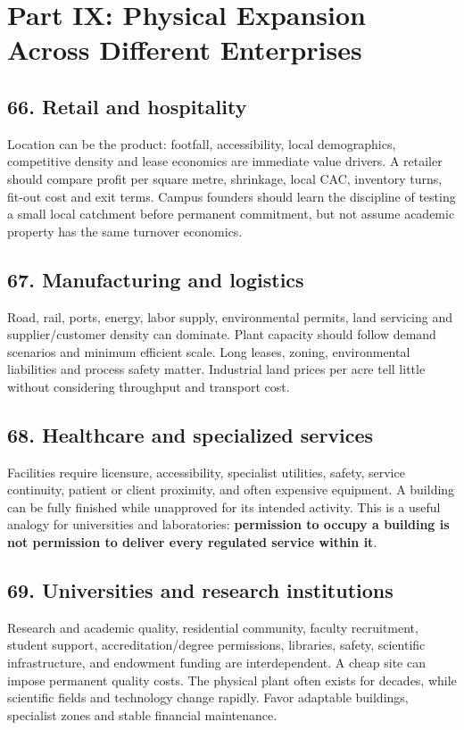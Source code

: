 \section*{Part IX: Physical Expansion Across Different Enterprises}


\subsection{66. Retail and hospitality}

Location can be the product: footfall, accessibility, local demographics, competitive density and lease economics are immediate value drivers. A retailer should compare profit per square metre, shrinkage, local CAC, inventory turns, fit-out cost and exit terms. Campus founders should learn the discipline of testing a small local catchment before permanent commitment, but not assume academic property has the same turnover economics.


\subsection{67. Manufacturing and logistics}

Road, rail, ports, energy, labor supply, environmental permits, land servicing and supplier/customer density can dominate. Plant capacity should follow demand scenarios and minimum efficient scale. Long leases, zoning, environmental liabilities and process safety matter. Industrial land prices per acre tell little without considering throughput and transport cost.


\subsection{68. Healthcare and specialized services}

Facilities require licensure, accessibility, specialist utilities, safety, service continuity, patient or client proximity, and often expensive equipment. A building can be fully finished while unapproved for its intended activity. This is a useful analogy for universities and laboratories: \textbf{permission to occupy a building is not permission to deliver every regulated service within it}.


\subsection{69. Universities and research institutions}

Research and academic quality, residential community, faculty recruitment, student support, accreditation/degree permissions, libraries, safety, scientific infrastructure, and endowment funding are interdependent. A cheap site can impose permanent quality costs. The physical plant often exists for decades, while scientific fields and technology change rapidly. Favor adaptable buildings, specialist zones and stable financial maintenance.
